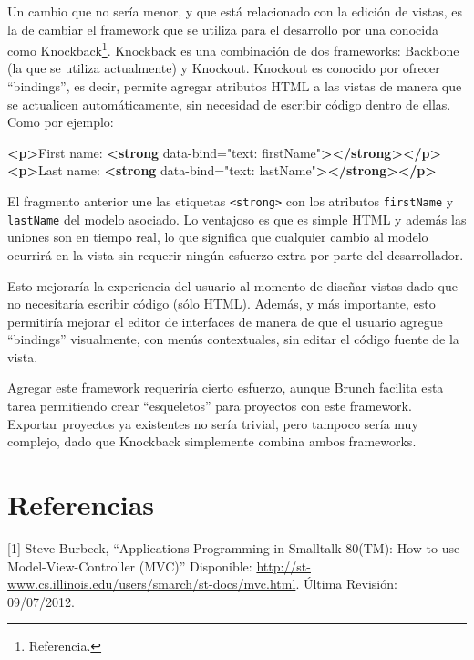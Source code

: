\documentclass[12pt,titlepage,]{article}
\newenvironment{Shaded}{}{}
\newcommand{\KeywordTok}[1]{\textcolor[rgb]{0.00,0.44,0.13}{\textbf{{#1}}}}
\newcommand{\StringTok}[1]{\textcolor[rgb]{0.25,0.44,0.63}{{#1}}}
\newcommand{\OtherTok}[1]{\textcolor[rgb]{0.00,0.44,0.13}{{#1}}}
\newcommand{\NormalTok}[1]{{#1}}
\begin{document}
Un cambio que no sería menor, y que está relacionado con la edición de
vistas, es la de cambiar el framework que se utiliza para el desarrollo
por una conocida como Knockback\footnote{Referencia.}. Knockback es una
combinación de dos frameworks: Backbone (la que se utiliza actualmente)
y Knockout. Knockout es conocido por ofrecer ``bindings'', es decir,
permite agregar atributos HTML a las vistas de manera que se actualicen
automáticamente, sin necesidad de escribir código dentro de ellas. Como
por ejemplo:

\begin{Shaded}
\begin{Highlighting}[]
\KeywordTok{<p>}\NormalTok{First name: }\KeywordTok{<strong}\OtherTok{ data-bind=}\StringTok{"text: firstName"}\KeywordTok{></strong></p>}
\KeywordTok{<p>}\NormalTok{Last name: }\KeywordTok{<strong}\OtherTok{ data-bind=}\StringTok{"text: lastName"}\KeywordTok{></strong></p>}
\end{Highlighting}
\end{Shaded}

El fragmento anterior une las etiquetas
\texttt{\textless{}strong\textgreater{}} con los atributos
\texttt{firstName} y \texttt{lastName} del modelo asociado. Lo ventajoso
es que es simple HTML y además las uniones son en tiempo real, lo que
significa que cualquier cambio al modelo ocurrirá en la vista sin
requerir ningún esfuerzo extra por parte del desarrollador.

Esto mejoraría la experiencia del usuario al momento de diseñar vistas
dado que no necesitaría escribir código (sólo HTML). Además, y más
importante, esto permitiría mejorar el editor de interfaces de manera de
que el usuario agregue ``bindings'' visualmente, con menús contextuales,
sin editar el código fuente de la vista.

Agregar este framework requeriría cierto esfuerzo, aunque Brunch
facilita esta tarea permitiendo crear ``esqueletos'' para proyectos con
este framework. Exportar proyectos ya existentes no sería trivial, pero
tampoco sería muy complejo, dado que Knockback simplemente combina ambos
frameworks.

\clearpage
\newpage

\section{Referencias}

{[}1{]} Steve Burbeck, ``Applications Programming in Smalltalk-80(TM):
How to use Model-View-Controller (MVC)'' Disponible:
\href{http://st-www.cs.illinois.edu/users/smarch/st-docs/mvc.html}{http://st-www.cs.illinois.edu/users/smarch/st-docs/mvc.html}.
Última Revisión: 09/07/2012.
\end{document}
